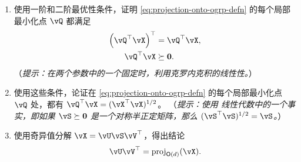 \documentclass[../../book-main_zh.tex]{subfiles}
\begin{document}
\begin{exercise}
\begin{enumerate}
        \begin{enumerate}
            \item 使用一阶和二阶最优性条件，证明 \eqref{eq:projection-onto-ogrp-defn} 的每个局部最小化点 $\vQ$ 都满足
            \begin{align*}
                \left( \vQ^\top \vX \right)^\top &= \vQ^\top \vX, \\
                \vQ^\top \vX &\succeq \mathbf{0}.
            \end{align*}
            （\textit{提示：在两个参数中的一个固定时，利用克罗内克积的线性性。}）
            \item 使用这些条件，论证在 \eqref{eq:projection-onto-ogrp-defn} 的每个局部最小化点 $\vQ$ 处，都有 $\vQ^\top \vX = (\vX^\top \vX)^{1/2}$。
            （\textit{提示：使用%
            线性代数中的一个事实，即如果 $\vS \succeq \mathbf{0}$ 是一个对称半正定矩阵，那么 $(\vS^\top\vS)^{1/2} = \vS$。}）
            \item 使用奇异值分解 $\vX = \vU \vS \vV^\top$，得出结论
            \begin{equation*}
                \vU \vV^\top
                =
                \mathrm{proj}_{\O(d)}(\vX).
            \end{equation*}
        \end{enumerate}
    \end{enumerate}
\end{exercise}

\end{document}
